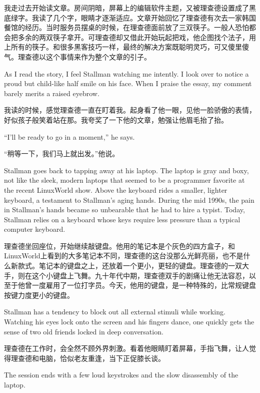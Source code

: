 \ifdefined\chs
我走过去开始读文章。房间阴暗，屏幕上的编辑软件主题，又被理查德设置成了黑底绿字。我读了几个字，眼睛才逐渐适应。文章开始回忆了理查德有次去一家韩国餐馆的经历。当时服务员摆桌的时候，在理查德面前放了三双筷子。一般人恐怕都会把多余的两双筷子拿开。可理查德却又借此开始玩起把戏，他企图找个法子，用上所有的筷子。和很多黑客技巧一样，最终的解决方案既聪明灵巧，可又傻里傻气。理查德以这个事情来作为整个文章的引子。
\fi

\ifdefined\eng
As I read the story, I feel Stallman watching me intently. I look over to notice a proud but child-like half smile on his face. When I praise the essay, my comment barely merits a raised eyebrow.
\fi

\ifdefined\chs
我读的时候，感觉理查德一直在盯着我。起身看了他一眼，见他一脸骄傲的表情，好似孩子般笑着站在那。我夸奖了一下他的文章，勉强让他眉毛抬了抬。
\fi

\ifdefined\eng
``I'll be ready to go in a moment,'' he says.
\fi

\ifdefined\chs
“稍等一下，我们马上就出发。”他说。
\fi

\ifdefined\eng
Stallman goes back to tapping away at his laptop. The laptop is gray and boxy, not like the sleek, modern laptops that seemed to be a programmer favorite at the recent LinuxWorld show. Above the keyboard rides a smaller, lighter keyboard, a testament to Stallman's aging hands. During the mid 1990s, the pain in Stallman's hands became so unbearable that he had to hire a typist. Today, Stallman relies on a keyboard whose keys require less pressure than a typical computer keyboard.
\fi

\ifdefined\chs
理查德坐回座位，开始继续敲键盘。他用的笔记本是个灰色的四方盒子，和LinuxWorld上看到的大多笔记本不同，理查德的这台没那么光鲜亮丽，也不是什么新款式。笔记本的键盘之上，还放着一个更小，更轻的键盘。理查德的一双大手，则在这个小键盘上飞舞。九十年代中期，理查德双手的剧痛让他无法容忍，以至于他曾一度雇用了一位打字员。今天，他用的键盘，是一种特殊的，比常规键盘按键力度更小的键盘。
\fi

\ifdefined\eng
Stallman has a tendency to block out all external stimuli while working. Watching his eyes lock onto the screen and his fingers dance, one quickly gets the sense of two old friends locked in deep conversation.
\fi

\ifdefined\chs
理查德在工作时，会全然不顾外界刺激。看着他眼睛盯着屏幕，手指飞舞，让人觉得理查德和电脑，恰似老友重逢，当下正促膝长谈。
\fi

\ifdefined\eng
The session ends with a few loud keystrokes and the slow disassembly of the laptop.
\fi

